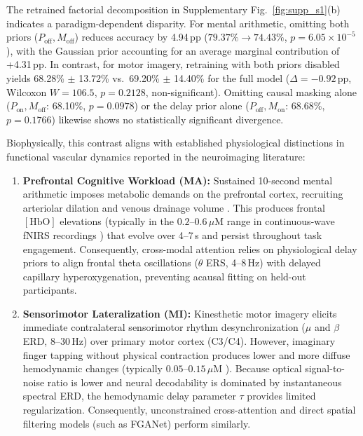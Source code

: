 \documentclass[journal]{IEEEtran}
\begin{document}
The retrained factorial decomposition in Supplementary Fig.~\ref{fig:supp_s1}(b) indicates a paradigm-dependent disparity. For mental arithmetic, omitting both priors ($P_{\mathrm{off}}, M_{\mathrm{off}}$) reduces accuracy by 4.94\,pp ($79.37\% \to 74.43\%$, $p = 6.05 \times 10^{-5}$), with the Gaussian prior accounting for an average marginal contribution of +4.31\,pp. In contrast, for motor imagery, retraining with both priors disabled yields 68.28\% $\pm$ 13.72\% vs.\ 69.20\% $\pm$ 14.40\% for the full model ($\Delta = -0.92$\,pp, Wilcoxon $W = 106.5$, $p = 0.2128$, non-significant). Omitting causal masking alone ($P_{\mathrm{on}}, M_{\mathrm{off}}$: 68.10\%, $p = 0.0978$) or the delay prior alone ($P_{\mathrm{off}}, M_{\mathrm{on}}$: 68.68\%, $p = 0.1766$) likewise shows no statistically significant divergence.

Biophysically, this contrast aligns with established physiological distinctions in functional vascular dynamics reported in the neuroimaging literature:
\begin{enumerate}
    \item \textbf{Prefrontal Cognitive Workload (MA):} Sustained 10-second mental arithmetic imposes metabolic demands on the prefrontal cortex, recruiting arteriolar dilation and venous drainage volume \cite{buxton1998dynamics, scholkmann2014review}. This produces frontal $[\mathrm{HbO}]$ elevations (typically in the $0.2\text{--}0.6\,\mu\mathrm{M}$ range in continuous-wave fNIRS recordings \cite{shin2017open}) that evolve over 4--7\,s and persist throughout task engagement. Consequently, cross-modal attention relies on physiological delay priors to align frontal theta oscillations ($\theta$ ERS, 4--8\,Hz) with delayed capillary hyperoxygenation, preventing acausal fitting on held-out participants.
    \item \textbf{Sensorimotor Lateralization (MI):} Kinesthetic motor imagery elicits immediate contralateral sensorimotor rhythm desynchronization ($\mu$ and $\beta$ ERD, 8--30\,Hz) over primary motor cortex (C3/C4). However, imaginary finger tapping without physical contraction produces lower and more diffuse hemodynamic changes (typically $0.05\text{--}0.15\,\mu\mathrm{M}$ \cite{shin2017open, pinti2020present}). Because optical signal-to-noise ratio is lower and neural decodability is dominated by instantaneous spectral ERD, the hemodynamic delay parameter $\tau$ provides limited regularization. Consequently, unconstrained cross-attention and direct spatial filtering models (such as FGANet) perform similarly.
\end{enumerate}
\end{document}
